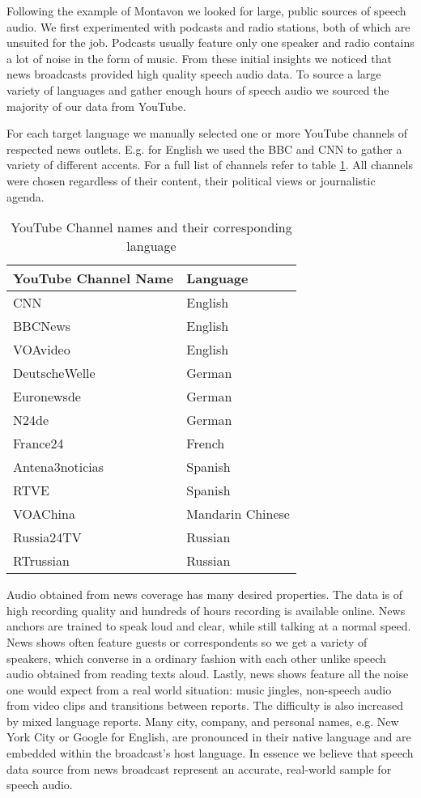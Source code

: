 	Following the example of Montavon \cite{montavon2009deep} we looked for large, public sources of speech audio. We first experimented with podcasts and radio stations, both of which are unsuited for the job. Podcasts usually feature only one speaker and radio contains a lot of noise in the form of music. From these initial insights we noticed that news broadcasts provided high quality speech audio data. To source a large variety of languages and gather enough hours of speech audio we sourced the majority of our data from YouTube. 
	
	For each target language we manually selected one or more YouTube channels of respected news outlets. E.g. for English we used the BBC and CNN to gather a variety of different accents. For a full list of channels refer to table \ref{tab:channels}. All channels were chosen regardless of their content, their political views or journalistic agenda.
	
	\begin{table}[]
	\centering
	\begin{tabularx}{\textwidth}{ll}
	\toprule
	YouTube Channel Name  & Language \\ \midrule
	CNN                   & English \\
	BBCNews               & English \\
	VOAvideo              & English \\
	DeutscheWelle         & German \\
	Euronewsde            & German \\
	N24de                 & German \\
	France24              & French \\
	Antena3noticias       & Spanish \\
	RTVE                  & Spanish \\
	VOAChina              & Mandarin Chinese  \\
	Russia24TV            & Russian \\
	RTrussian             & Russian \\ \bottomrule
	\end{tabularx}
	\caption{YouTube Channel names and their corresponding language}
	\label{tab:channels}
	\end{table}

  	
  	Audio obtained from news coverage has many desired properties. The data is of high recording quality and hundreds of hours recording is available online. News anchors are trained to speak loud and clear, while still talking at a normal speed. News shows often feature guests or correspondents so we get a variety of speakers, which converse in a ordinary fashion with each other unlike speech audio obtained from reading texts aloud. Lastly, news shows feature all the noise one would expect from a real world situation: music jingles, non-speech audio from video clips and transitions between reports. The difficulty is also increased by mixed language reports. Many city, company, and personal names, e.g. New York City or Google for English, are pronounced in their native language and are embedded within the broadcast's host language. In essence we believe that speech data source from news broadcast represent an accurate, real-world sample for speech audio.
  	
